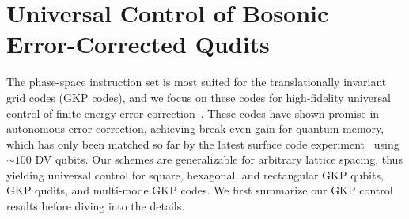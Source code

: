 \documentclass[aps,prx,showpacs,notitlepage,twocolumn,superscriptaddress,nofootinbib,preprintnumbers,floatfix,10pt, longbibliography]{revtex4-2}
\begin{document}
 \section{Universal Control of Bosonic Error-Corrected Qudits}\label{sec:GKP}
The phase-space instruction set is most suited for the translationally invariant grid codes (GKP codes), and we focus on these codes for high-fidelity universal control of finite-energy error-correction~\cite{royer2020stabilization,brock2024quantum,eickbusch2022fast,sivak2023real}. These codes have shown promise in autonomous error correction, achieving break-even gain for quantum memory, which has only been matched so far by the latest surface code experiment~\cite{acharya2024quantum} using $\sim 100$ DV qubits. 
Our schemes are generalizable for arbitrary lattice spacing, thus yielding universal control for square, hexagonal, and rectangular GKP qubits, GKP qudits, and multi-mode GKP codes. We first summarize our GKP control results before diving into the details. 
\end{document}
